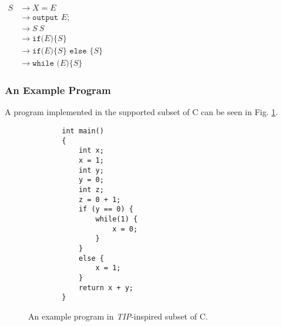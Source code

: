 $
\begin{aligned} S & \rightarrow X = E \\
& \rightarrow \texttt {output } E ; \\ 
& \rightarrow S\:S \\ 
& \rightarrow \texttt{if(}E\texttt{)}\{S\} \\ 
& \rightarrow \texttt{if(} E \texttt{)}\{S\} \texttt { else }\{S\} \\ 
& \rightarrow \texttt {while (}E\texttt{)}\{ S\}
\end{aligned}
$

\subsubsection{An Example Program}
A program implemented in the supported subset of C can be seen in Fig. \ref{exampleprogram}.

\begin{figure}[H]
    \centering
    \begin{verbatim}
        int main()
        {
            int x;
            x = 1;
            int y;
            y = 0;
            int z;
            z = 0 + 1;
            if (y == 0) {
                while(1) {
                    x = 0;
                }
            }
            else {
                x = 1;
            }
            return x + y;
        }
    \end{verbatim}
    \caption{An example program in \textit{TIP}-inspired subset of C.}
    \label{exampleprogram}
\end{figure}

